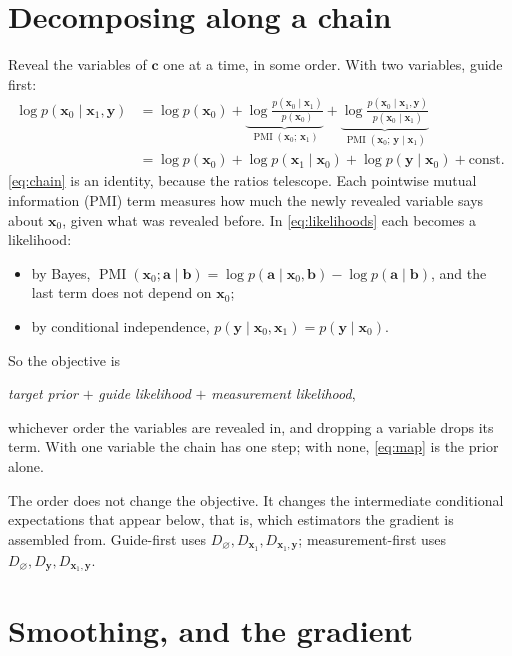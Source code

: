 \documentclass[11pt]{article}
\theoremstyle{remark}
\newcommand{\x}{\bm{x}}
\newcommand{\y}{\bm{y}}
\newcommand{\cc}{\bm{c}}
\newcommand{\PMI}{\operatorname{PMI}}
\newcommand{\Dz}{D_{\varnothing}}
\newcommand{\Dg}{D_{\x_1}}
\newcommand{\Dy}{D_{\y}}
\newcommand{\Dgy}{D_{\x_1,\y}}
\begin{document}
\section{Decomposing along a chain}

Reveal the variables of $\cc$ one at a time, in some order. With two variables, guide first:
\begin{align}
  \log p(\x_0\mid\x_1,\y)
  &= \log p(\x_0)
   + \underbrace{\log\frac{p(\x_0\mid\x_1)}{p(\x_0)}}_{\PMI(\x_0;\,\x_1)}
   + \underbrace{\log\frac{p(\x_0\mid\x_1,\y)}{p(\x_0\mid\x_1)}}_{\PMI(\x_0;\,\y\mid\x_1)}
  \label{eq:chain}\\
  &= \log p(\x_0) + \log p(\x_1\mid\x_0) + \log p(\y\mid\x_0) + \mathrm{const}.
  \label{eq:likelihoods}
\end{align}
\eqref{eq:chain} is an identity, because the ratios telescope. Each pointwise mutual
information (PMI) term measures how much the newly revealed variable says about $\x_0$, given
what was revealed before. In \eqref{eq:likelihoods} each becomes a likelihood:
\begin{itemize}[leftmargin=1.5em, itemsep=1pt]
  \item by Bayes, $\PMI(\x_0;\bm a\mid\bm b) = \log p(\bm a\mid\x_0,\bm b) - \log p(\bm a\mid\bm
        b)$, and the last term does not depend on $\x_0$;
  \item by conditional independence, $p(\y\mid\x_0,\x_1) = p(\y\mid\x_0)$.
\end{itemize}
So the objective is
\begin{center}
  \emph{target prior} $+$ \emph{guide likelihood} $+$ \emph{measurement likelihood},
\end{center}
whichever order the variables are revealed in, and dropping a variable drops its term. With one
variable the chain has one step; with none, \eqref{eq:map} is the prior alone.

The order does not change the objective. It changes the intermediate conditional expectations
that appear below, that is, which estimators the gradient is assembled from. Guide-first uses
$\Dz,\Dg,\Dgy$; measurement-first uses $\Dz,\Dy,\Dgy$.

\section{Smoothing, and the gradient}
\end{document}
